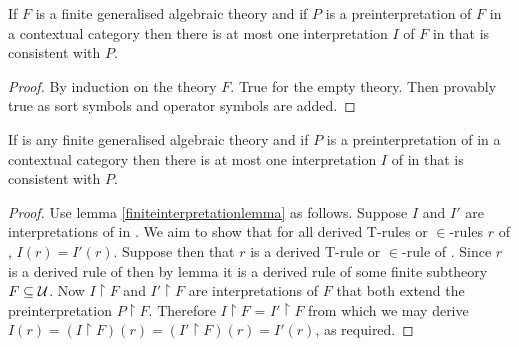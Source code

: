 \begin{oldtt}
\note 
\begin{lemmastar}
\label{finiteinterpretationlemma}
If $F$ is a finite generalised algebraic theory and if $P$ is a preinterpretation of $F$ in a contextual category \catcw then there is at most one interpretation $I$ of $F$ in \catcw that is consistent with $P$.
\end{lemmastar}
\begin{proof}
By induction on the theory $F$. True for the empty theory. Then provably true as sort symbols and operator symbols are added.
\end{proof} 
\begin{lemmastar}
If \gatUw is any finite generalised algebraic theory and if $P$ is a preinterpretation of \gatUw in a contextual category \catcw then there is at most one interpretation $I$ of \gatUw in \catcw that is consistent with $P$.
\end{lemmastar}
\begin{proof}
Use lemma \ref{finiteinterpretationlemma} as follows.
Suppose $I$ and $I'$ are interpretations of \gatUw in \catc.
We aim to show that for all derived T-rules or $\in$-rules $r$ of \gatU, $I(r)=I'(r)$.
Suppose then that $r$ is a derived T-rule or $\in$-rule of \gatU. Since $r$ is a derived rule of \gatUw then by lemma  it is a derived rule of some finite subtheory $F \subseteq \mathcal{U}$. 
Now $I \restriction F$ and $I' \restriction F$ are interpretations
of $F$ that both extend the preinterpretation $P \restriction F$. Therefore $I \restriction F$ = $I' \restriction F$
from which we may derive $I(r) = (I \restriction F) (r) = (I' \restriction F)(r) = I'(r)$, as required. 
\end{proof}
\end{oldtt}

